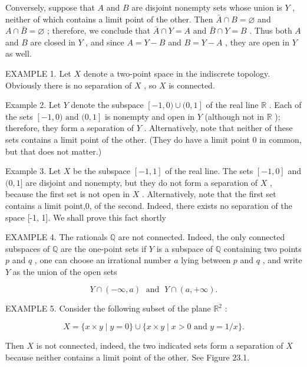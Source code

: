 \documentclass[10pt]{article}
\begin{document}
Conversely, suppose that \(A\) and \(B\) are disjoint nonempty sets whose union is \(Y\) , neither of which contains a limit point of the other. Then \(\bar{A} \cap  B = \varnothing\) and \(A \cap  \bar{B} = \varnothing\) ; therefore, we conclude that \(\bar{A} \cap  Y = A\) and \(\bar{B} \cap  Y = B\) . Thus both \(A\) and \(B\) are closed in \(Y\) , and since \(A = Y - B\) and \(B = Y - A\) , they are open in \(Y\) as well.

EXAMPLE 1. Let \(X\) denote a two-point space in the indiscrete topology. Obviously there is no separation of \(X\) , so \(X\) is connected.

Example 2. Let \(Y\) denote the subspace \(\left\lbrack  {-1,0)\cup (0,1}\right\rbrack\) of the real line \(\mathbb{R}\) . Each of the sets \(\left\lbrack  {-1,0)\text{ and }(0,1}\right\rbrack\) is nonempty and open in \(Y\) (although not in \(\mathbb{R}\) ); therefore, they form a separation of \(Y\) . Alternatively, note that neither of these sets contains a limit point of the other. (They do have a limit point 0 in common, but that does not matter.)

Example 3. Let \(X\) be the subspace \(\left\lbrack  {-1,1}\right\rbrack\) of the real line. The sets \(\left\lbrack  {-1,0}\right\rbrack\) and \((0,1\rbrack\) are disjoint and nonempty, but they do not form a separation of \(X\) , because the first set is not open in \(X\) . Alternatively, note that the first set contains a limit point,0, of the second. Indeed, there exists no separation of the space [-1, 1]. We shall prove this fact shortly

EXAMPLE 4. The rationals \(\mathbb{Q}\) are not connected. Indeed, the only connected subspaces of \(\mathbb{Q}\) are the one-point sets if \(Y\) is a subspace of \(\mathbb{Q}\) containing two points \(p\) and \(q\) , one can choose an irrational number \(a\) lying between \(p\) and \(q\) , and write \(Y\) as the union of the open sets

\[
Y \cap  \left( {-\infty ,a}\right) \;\text{ and }\;Y \cap  \left( {a, + \infty }\right) .
\]

EXAMPLE 5. Consider the following subset of the plane \({\mathbb{R}}^{2}\) :

\[
X = \{ x \times  y \mid  y = 0\}  \cup  \{ x \times  y \mid  x > 0\text{ and }y = 1/x\} .
\]

Then \(X\) is not connected, indeed, the two indicated sets form a separation of \(X\) because neither contains a limit point of the other. See Figure 23.1.
\end{document}

